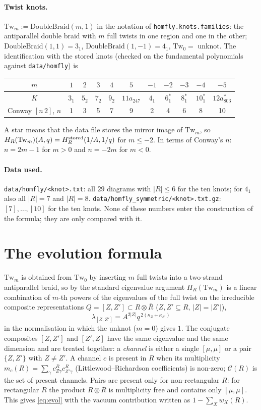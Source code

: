\documentclass[11pt]{article}
\newcommand{\Tw}{\mathrm{Tw}}
\newcommand{\Chan}{\mathcal C}
\newcommand{\Rbar}{\bar R}
\newcommand{\LMPH}[1]{\texttt{#1}}
\begin{document}
\paragraph{Twist knots.}  $\Tw_m:=\mathrm{DoubleBraid}(m,1)$ in the notation of \LMPH{homfly.knots.families}: the
antiparallel double braid with $m$ full twists in one region and one in the other; $\mathrm{DoubleBraid}(1,1)=3_1$,
$\mathrm{DoubleBraid}(1,-1)=4_1$, $\Tw_0=$ unknot.  The identification with the stored knots (checked on the fundamental
polynomials against \LMPH{data/homfly}) is
\begin{center}
\begin{tabular}{c|cccccccccc}
$m$ & $1$ & $2$ & $3$ & $4$ & $5$ & $-1$ & $-2$ & $-3$ & $-4$ & $-5$\\ \midrule
$K$ & $3_1$ & $5_2$ & $7_2$ & $9_2$ & $11a_{247}$ & $4_1$ & $6_1^{*}$ & $8_1^{*}$ & $10_1^{*}$ & $12a_{803}^{*}$\\
Conway $[n\,2]$, $n$ & 1 & 3 & 5 & 7 & 9 & 2 & 4 & 6 & 8 & 10
\end{tabular}
\end{center}
A star means that the data file stores the mirror image of $\Tw_m$, so $H_R(\Tw_m)(A,q)=H_R^{\rm stored}(1/A,1/q)$
for $m\le-2$.  In terms of Conway's $n$: $n=2m-1$ for $m>0$ and $n=-2m$ for $m<0$.

\paragraph{Data used.}  \LMPH{data/homfly/<knot>.txt}: all $29$ diagrams with $|R|\le6$ for the ten knots; for $4_1$
also all $|R|=7$ and $|R|=8$.  \LMPH{data/homfly\_symmetric/<knot>.txt.gz}: $[7],\dots,[10]$ for the ten knots.  None
of these numbers enter the construction of the formula; they are only compared with it.

\section{The evolution formula}\label{sec:evol}

$\Tw_m$ is obtained from $\Tw_0$ by inserting $m$ full twists into a two-strand antiparallel braid, so by the
standard eigenvalue argument $H_R(\Tw_m)$ is a linear combination of $m$-th powers of the eigenvalues of the full twist
on the irreducible composite representations $Q=[Z,Z']\subset R\otimes\Rbar$ ($Z,Z'\subseteq R$, $|Z|=|Z'|$),
\[
\lambda_{[Z,Z']}=A^{2|Z|}q^{\,2(\kappa_Z+\kappa_{Z'})}
\]
in the normalisation in which the unknot ($m=0$) gives $1$.  The conjugate composites $[Z,Z']$ and $[Z',Z]$ have the
same eigenvalue and the same dimension and are treated together: a \emph{channel} is either a single $[\mu,\mu]$ or a
pair $\{Z,Z'\}$ with $Z\ne Z'$.  A channel $c$ is present in $R$ when its multiplicity
$m_c(R)=\sum_\gamma c^R_{Z\gamma}c^R_{Z'\gamma}$ (Littlewood--Richardson coefficients) is non-zero; $\Chan(R)$ is the set
of present channels.  Pairs are present only for non-rectangular $R$: for rectangular $R$ the product $R\otimes\Rbar$
is multiplicity free and contains only $[\mu,\mu]$.  This gives \eqref{eq:evol} with the vacuum contribution written
as $1-\sum_X w_X(R)$.
\end{document}
